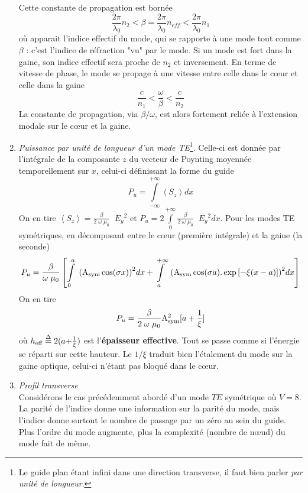 \begin{enumerate}
Cette constante de propagation est bornée
\begin{equation}
\frac{{2\pi }}{{{\lambda _0}}}{n_2} < \beta  = \frac{{2\pi }}{{{\lambda _0}}}{n_{eff}} < \frac{{2\pi }}{{{\lambda _0}}}{n_1}
\end{equation}
où apparait l'indice effectif du mode, qui se rapporte à une mode tout comme $\beta$ : c'est 
l'indice de réfraction "vu" par le mode. Si un mode est fort dans la gaine, son indice effectif sera
proche de $n_2$ et inversement. En terme de vitesse de phase, le mode se propage à une vitesse entre
celle dans le cœur et celle dans la gaine
\begin{equation}
\frac{c}{{{n_1}}} < \frac{\omega }{\beta } < \frac{c}{{{n_2}}}
\end{equation}
La constante de propagation, via $\beta/\omega$, est alors fortement reliée à l'extension modale sur
le cœur et la gaine.
\newpage
\item \textit{Puissance par unité de longueur d'un mode TE}\footnote{Le guide plan étant infini
dans une direction transverse, il faut bien parler \textit{par unité de longueur}.}.
Celle-ci est donnée par l'intégrale de la composante $z$ du vecteur de Poynting moyennée 
temporellement sur $x$, celui-ci définissant la forme du guide
\begin{equation}
{P_u} = \int\limits_{ - \infty }^{ + \infty } {\left\langle {{S_z}} \right\rangle dx} 
\end{equation}
On en tire $\left\langle {{S_z}} \right\rangle  = \frac{\beta }{{2\;\omega \;{\mu _0}}}\;\;{E_y}{^2}$
et ${P_u} = 2\int\limits_0^{ + \infty } {\frac{\beta }{{2\;\omega \;{\mu _0}}}\;\;{E_y}{^2}dx}$. 
Pour les modes TE symétriques, en décomposant entre le cœur (première intégrale) et la gaine (la
seconde)
\begin{equation}
{P_u} = \frac{\beta }{{\omega \;{\mu _0}}}\left[ {\int\limits_0^a {\;{{({{\rm{A}}_{{\rm{sym}}}}\cos (\sigma x))}^2}dx + \int\limits_a^{ + \infty } {\;{{({{\rm{A}}_{{\rm{sym}}}}\cos (\sigma a).\exp \left[ { - \xi (x - a)} \right])}^2}dx} } } \right]
\end{equation}
On en tire
\begin{equation}
{P_u} = \frac{\beta }{{2\;\omega \;{\mu _0}}}{\rm{A}}_{{\rm{sym}}}^2[a + \frac{1}{\xi }]
\end{equation}
où ${h_{{\rm{eff}}}} \buildrel \Delta \over = {\rm{2(}}a{\rm{ + }}\frac{{\rm{1}}}{\xi }{\rm{)}}$ est
l'\textbf{épaisseur effective}. Tout se passe comme si l'énergie se réparti sur cette hauteur. Le
$1/\xi$ traduit bien l'étalement du mode sur la gaine optique, celui-ci n'étant pas bloqué dans le
cœur.
\item \textit{Profil transverse}\\
Considérons le cas précédemment abordé d'un mode $TE$ symétrique où $V=8$. La parité de l'indice 
donne une information sur la parité du mode, mais l'indice donne surtout le nombre de passage
par un zéro au sein du guide. Plus l'ordre du mode augmente, plus la complexité (nombre de nœud) du
mode fait de même. 


\end{enumerate}
